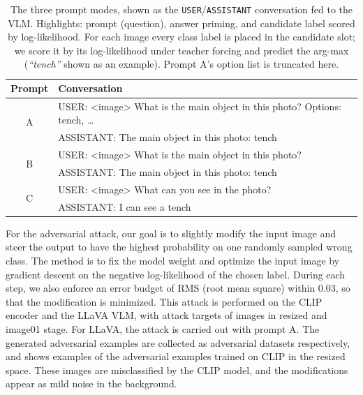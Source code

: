 \documentclass{article}
\newcommand{\hlQ}[1]{\colorbox{hlQ}{#1}}
\newcommand{\hlP}[1]{\colorbox{hlP}{#1}}
\newcommand{\hlT}[1]{\colorbox{hlT}{#1}}
\begin{document}
\begin{table}[!b]
  \centering
  \caption{
    The three prompt modes, shown as the \texttt{USER}/\texttt{ASSISTANT} conversation fed to the VLM.
    Highlights: \hlQ{prompt (question)}, \hlP{answer priming}, and \hlT{candidate label scored by log-likelihood}.
    For each image every class label is placed in the candidate slot; we score it by its log-likelihood under teacher forcing and predict the arg-max (\emph{``tench''} shown as an example).
    Prompt A's option list is truncated here.
  }
  \label{tab:prompts}
  \vspace{0.5em}
  \footnotesize
  \begin{tabular}{@{}c l@{}}
    \toprule
    Prompt & Conversation \\
    \midrule
    \multirow{2}{*}{A}
      & \ttfamily USER: <image> \hlQ{What is the main object in this photo? Options: tench, \dots} \\[2pt]
      & \ttfamily ASSISTANT: \hlP{The main object in this photo:}\hlT{ tench} \\
    \midrule
    \multirow{2}{*}{B}
      & \ttfamily USER: <image> \hlQ{What is the main object in this photo?} \\[2pt]
      & \ttfamily ASSISTANT: \hlP{The main object in this photo:}\hlT{ tench} \\
    \midrule
    \multirow{2}{*}{C}
      & \ttfamily USER: <image> \hlQ{What can you see in the photo?} \\[2pt]
      & \ttfamily ASSISTANT: \hlP{I can see a}\hlT{ tench} \\
    \bottomrule
  \end{tabular}
\end{table}

For the adversarial attack, our goal is to slightly modify the input image and steer the output to have the highest probability on one randomly sampled wrong class. The method is to fix the model weight and optimize the input image by gradient descent on the negative log-likelihood of the chosen label.
During each step, we also enforce an error budget of RMS (root mean square) within 0.03, so that the modification is minimized.
This attack is performed on the CLIP encoder and the LLaVA VLM, with attack targets of images in resized and image01 stage. 
For LLaVA, the attack is carried out with prompt A.
The generated adversarial examples are collected as adversarial datasets respectively, and  shows examples of the adversarial examples trained on CLIP in the resized space. These images are misclassified by the CLIP model, and the modifications appear as mild noise in the background.
\end{document}
